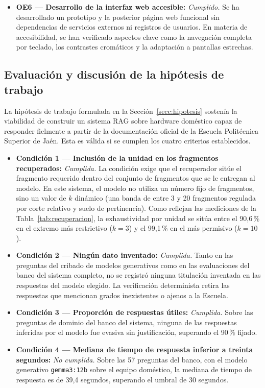 \begin{itemize}
  \item \textbf{OE6 --- Desarrollo de la interfaz web accesible:} 
        \textit{Cumplido.} Se ha desarrollado un prototipo y la posterior página web funcional sin dependencias de servicios externos ni registros de usuarios. En materia de accesibilidad, se han verificado aspectos clave como la navegación completa por teclado, los contrastes cromáticos y la adaptación a pantallas estrechas.
\end{itemize}

\subsection{Evaluación y discusión de la hipótesis de trabajo}
\label{secc:discusion_hipotesis}

La hipótesis de trabajo formulada en la Sección~\ref{secc:hipotesis} sostenía la viabilidad de construir un sistema RAG sobre hardware doméstico capaz de responder fielmente a partir de la documentación oficial de la Escuela Politécnica Superior de Jaén. Esta es válida si se cumplen los cuatro criterios establecidos. 


\begin{itemize}    
  \item \textbf{Condición 1 --- Inclusión de la unidad en los fragmentos recuperados:}
        \textit{Cumplida.} La condición exige que el recuperador sitúe el fragmento requerido dentro del conjunto de fragmentos que se le entregan al modelo. En este sistema, el modelo no utiliza un número fijo de fragmentos, sino un valor de $k$ dinámico (una banda de entre 3 y 20 fragmentos regulada por corte relativo y suelo de pertinencia). Como reflejan las mediciones de la Tabla~\ref{tab:recuperacion}, la exhaustividad por unidad se sitúa entre el 90,6\,\% en el extremo más restrictivo ($k=3$) y el 99,1\,\% en el más permisivo ($k=10$). 
        
        
  \item \textbf{Condición 2 --- Ningún dato inventado:} 
        \textit{Cumplida.} Tanto en las preguntas del cribado de modelos generativos como en las evaluaciones del banco del sistema completo, no se registró ninguna titulación inventada en las respuestas del modelo elegido. La verificación determinista retira las respuestas que mencionan grados inexistentes o ajenos a la Escuela.
        
  \item \textbf{Condición 3 --- Proporción de respuestas útiles:}
        \textit{Cumplida.} Sobre las preguntas de dominio del banco del sistema, ninguna de las respuestas inferidas por el modelo fue evasiva sin justificación, superando el 90\,\% fijado.
        
  \item \textbf{Condición 4 --- Mediana de tiempo de respuesta inferior a treinta segundos:} \textit{No cumplida.} Sobre las 57 preguntas del banco, con el modelo generativo \texttt{gemma3:12b} sobre el equipo doméstico, la mediana de tiempo de respuesta es de 39,4 segundos, superando el umbral de 30 segundos.
\end{itemize}

